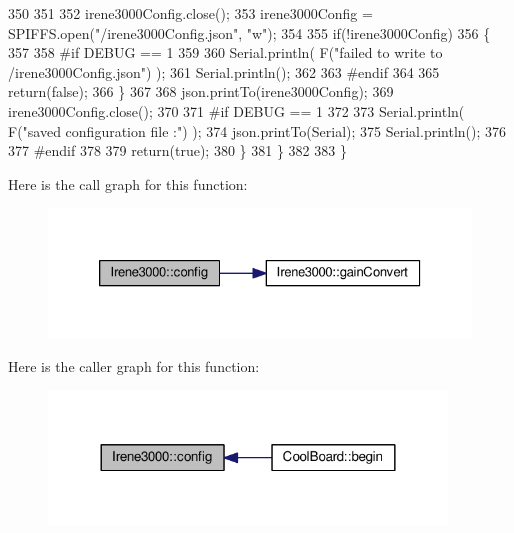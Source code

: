 \begin{DoxyCode}
350 
351 
352             irene3000Config.close();
353             irene3000Config = SPIFFS.open(\textcolor{stringliteral}{"/irene3000Config.json"}, \textcolor{stringliteral}{"w"});
354 
355             \textcolor{keywordflow}{if}(!irene3000Config)
356             \{
357             
358 \textcolor{preprocessor}{            #if DEBUG == 1}
359 
360                 Serial.println( F(\textcolor{stringliteral}{"failed to write to /irene3000Config.json"}) );
361                 Serial.println();
362             
363 \textcolor{preprocessor}{            #endif }
364 
365                 \textcolor{keywordflow}{return}(\textcolor{keyword}{false});
366             \}
367 
368             json.printTo(irene3000Config);
369             irene3000Config.close();
370             
371 \textcolor{preprocessor}{        #if DEBUG == 1 }
372 
373             Serial.println( F(\textcolor{stringliteral}{"saved configuration file :"})  );
374             json.printTo(Serial);
375             Serial.println();
376         
377 \textcolor{preprocessor}{        #endif}
378 
379             \textcolor{keywordflow}{return}(\textcolor{keyword}{true}); 
380         \}
381     \}   
382 
383 \}
\end{DoxyCode}
Here is the call graph for this function\+:\nopagebreak
\begin{figure}[H]
\begin{center}
\leavevmode
\includegraphics[width=326pt]{d6/d03/class_irene3000_afed5c35e4b23963c157847ef27c11e9c_cgraph}
\end{center}
\end{figure}
Here is the caller graph for this function\+:\nopagebreak
\begin{figure}[H]
\begin{center}
\leavevmode
\includegraphics[width=300pt]{d6/d03/class_irene3000_afed5c35e4b23963c157847ef27c11e9c_icgraph}
\end{center}
\end{figure}
\mbox{\label{class_irene3000_abcad62d1201a59f8dd3ba87048002728}} 

